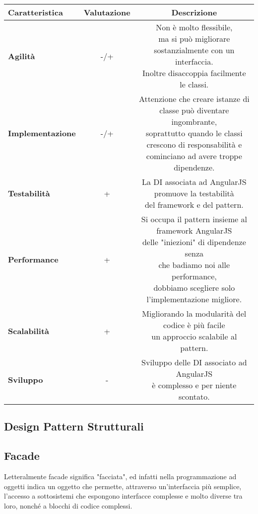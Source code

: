{{{\begin{itemize}
				\small %
				{\renewcommand\arraystretch{1.2} %
					\begin{tabular}{|l|c|c|}
						\hline
						{\textbf{Caratteristica}}&{\textbf{Valutazione}}&{\textbf{Descrizione}}\\
						\hline
						\textbf{Agilità} & -/+ &  \minitab[c]{Non è molto flessibile,\\ ma si può migliorare sostanzialmente con un interfaccia.\\Inoltre disaccoppia facilmente le classi.} \\
						\hline
						\textbf{Implementazione} & -/+ &  \minitab[c]{Attenzione che creare istanze di classe può diventare ingombrante,\\ soprattutto quando le classi\\ crescono di responsabilità e cominciano ad avere troppe dipendenze.} \\
						\hline
						\textbf{Testabilità} & + &  \minitab[c]{La DI associata ad AngularJS promuove la testabilità\\del framework e del pattern.}\\
						\hline
						\textbf{Performance} & + &  \minitab[c]{Si occupa il pattern insieme al framework AngularJS\\delle "iniezioni" di dipendenze senza\\che badiamo noi alle performance,\\dobbiamo scegliere solo l'implementazione migliore.} \\
						\hline
						\textbf{Scalabilità} & + &  \minitab[c]{Migliorando la modularità del codice è più facile\\un approccio scalabile al pattern.}\\
						\hline
						\textbf{Sviluppo} & - &  \minitab[c]{Sviluppo delle DI associato ad AngularJS\\ è complesso e per niente scontato.}\\
						\hline
					\end{tabular}
				}
			\end{itemize}
		}	
	}
	\subsection{Design Pattern Strutturali}{
		\subsection{Facade}{
			Letteralmente facade significa "facciata", ed infatti nella programmazione ad oggetti indica un oggetto che permette, attraverso un'interfaccia più semplice, l'accesso a sottosistemi che espongono interfacce complesse e molto diverse tra loro, nonché a blocchi di codice complessi.
			
}}}
